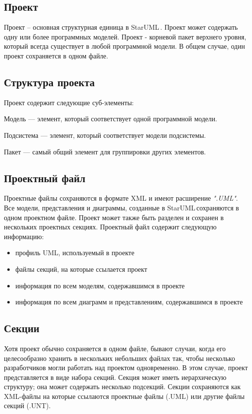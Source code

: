 \documentclass[a4paper,12pt]{report}
\newcommand{\staruml}{StarUML\,\tm}
\begin{document}
\subsection*{Проект}
Проект -- основная структурная единица в \staruml.
Проект может содержать одну или более программных моделей. Проект - корневой пакет
верхнего уровня, который всегда существует в любой программной модели. В общем случае, один
проект сохраняется в одном файле.

\subsection*{Структура проекта}
Проект содержит следующие суб-элементы:

Модель --- элемент, который соответствует одной программной модели.

Подсистема --- элемент, который соответствует модели подсистемы.

Пакет --- самый общий элемент для группировки других элементов.

\subsection*{Проектный файл}Проектные файлы сохраняются в формате XML и имеют расширение \textit{".UML"}. Все модели,
представления и диаграммы, созданные в \staruml сохраняются в одном проектном файле.
Проект может также быть разделен и сохранен в нескольких проектных секциях. Проектный файл
содержит следующую информацию:
\begin{itemize}
	\item профиль UML, используемый в проекте
	\item файлы секций, на которые ссылается проект
	\item информация по всем моделям, содержавшимся в проекте
	\item информация по всем диаграмм и представлениям, содержавшимся в проекте
\end{itemize}


\subsection*{Секции}
Хотя проект обычно сохраняется в одном файле, бывают случаи, когда его целесообразно
хранить в нескольких небольших файлах так, чтобы несколько разработчиков могли работать над
проектом одновременно. В этом случае, проект представляется в виде набора секций. Секция
может иметь иерархическую структуру; она может содержать несколько подсекций. Секции
сохраняются как XML-файлы на которые ссылаются проектные файлы (.UML) или другие файлы
секций (.UNT).
\end{document}
